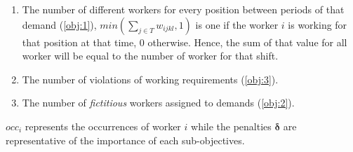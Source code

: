 \documentclass[../../thesis.tex]{subfiles}
\begin{document}
\begin{enumerate}
  \item The number of different workers for every position between periods of that demand (\ref{obj:1}), $min(\sum_{j \in T} w_{ijkl}, 1)$ is one if the worker $i$ is working for that position at that time, 0 otherwise. Hence, the sum of that value for all worker will be equal to the number of worker for that shift.
  \item The number of violations of working requirements (\ref{obj:3}).
  \item The number of \emph{fictitious} workers assigned to demands (\ref{obj:2}).
\end{enumerate}

$occ_i$ represents the occurrences of worker $i$ while the penalties $\bm{\delta}$ are representative of the importance of each sub-objectives.
\end{document}
